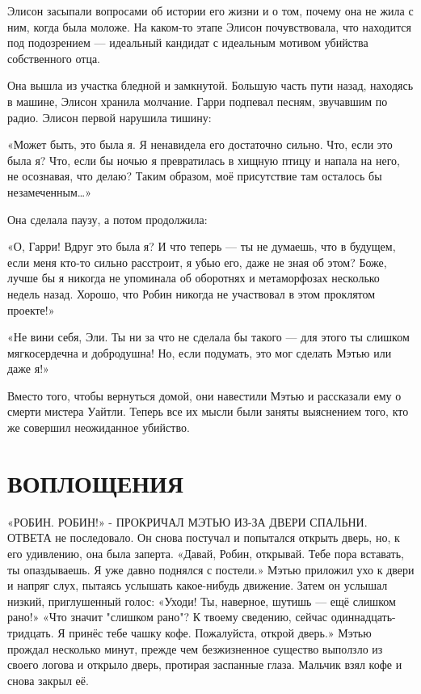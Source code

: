 \documentclass[a4paper,12pt]{book}
\begin{document}
\par
Элисон засыпали вопросами об истории его жизни и о том, почему она не жила с ним, когда была моложе. На каком-то этапе Элисон почувствовала, что находится под подозрением — идеальный кандидат с идеальным мотивом убийства собственного отца.\\
\par
Она вышла из участка бледной и замкнутой. Большую часть пути назад, находясь в машине, Элисон хранила молчание. Гарри подпевал песням, звучавшим по радио. Элисон первой нарушила тишину:
\par
«Может быть, это была я. Я ненавидела его достаточно сильно. Что, если это была я? Что, если бы ночью я превратилась в хищную птицу и напала на него, не осознавая, что делаю? Таким образом, моё присутствие там осталось бы незамеченным…»
\par
Она сделала паузу, а потом продолжила:
\par
«О, Гарри! Вдруг это была я? И что теперь — ты не думаешь, что в будущем, если меня кто-то сильно расстроит, я убью его, даже не зная об этом? Боже, лучше бы я никогда не упоминала об оборотнях и метаморфозах несколько недель назад. Хорошо, что Робин никогда не участвовал в этом проклятом проекте!»
\par
«Не вини себя, Эли. Ты ни за что не сделала бы такого — для этого ты слишком мягкосердечна и добродушна! Но, если подумать, это мог сделать Мэтью или даже я!»
\par
Вместо того, чтобы вернуться домой, они навестили Мэтью и рассказали ему о смерти мистера Уайтли. Теперь все их мысли были заняты выяснением того, кто же совершил неожиданное убийство.

\chapter{ВОПЛОЩЕНИЯ}
	«РОБИН. РОБИН!» - ПРОКРИЧАЛ МЭТЬЮ ИЗ-ЗА ДВЕРИ СПАЛЬНИ. ОТВЕТА не последовало. Он снова постучал и попытался открыть дверь, но, к его удивлению, она была заперта.
	«Давай, Робин, открывай. Тебе пора вставать, ты опаздываешь. Я уже давно поднялся с постели.»
	Мэтью приложил ухо к двери и напряг слух, пытаясь услышать какое-нибудь движение. Затем он услышал низкий, приглушенный голос:
	«Уходи! Ты, наверное, шутишь — ещё слишком рано!»
	«Что значит "слишком рано"? К твоему сведению, сейчас одиннадцать-тридцать. Я принёс тебе чашку кофе. Пожалуйста, открой дверь.»
	Мэтью прождал несколько минут, прежде чем безжизненное существо выползло из своего логова и открыло дверь, протирая заспанные глаза. Мальчик взял кофе и снова закрыл её.
\end{document}
